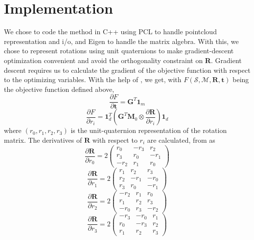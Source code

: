 \documentclass[11pt, a4paper]{article}
\begin{document}
\section{Implementation}
We chose to code the method in C++ using PCL to handle pointcloud representation and i/o, and Eigen to handle the matrix algebra. With this, we chose to represent rotations using unit quaternions to make gradient-descent optimization convenient and avoid the orthogonality constraint on \textbf{R}.
\linebreak \linebreak
\noindent Gradient descent requires us to calculate the gradient of the objective function with respect to the optimizing variables. With the help of \cite{mainPre}, we get, with $F(\mathcal{S}, \mathcal{M}, \textbf{R}, \textbf{t})$ being the objective function defined above, $$\frac{\partial F}{\partial \textbf{t}} = \textbf{G}^T\textbf{1}_m$$ $$\frac{\partial F}{\partial r_i} = \textbf{1}_d^T \left(\textbf{G}^T\textbf{M}_0 \otimes \frac{\partial \textbf{R}}{\partial r_i}\right)\textbf{1}_d$$ where $(r_0, r_1, r_2, r_3)$ is the unit-quaternion representation of the rotation matrix.
\linebreak \linebreak
\noindent
The derivatives of $\textbf{R}$ with respect to $r_i$ are calculated, from \cite{quatParam} as
$$\frac{\partial \textbf{R}}{\partial r_0} = 2\begin{pmatrix}
  r_0 & -r_3 & r_2 \\
  r_3 & r_0 & -r_1 \\
  -r_2 & r_1 & r_0
 \end{pmatrix}$$
$$\frac{\partial \textbf{R}}{\partial r_1} = 2\begin{pmatrix}
  r_1 & r_2 & r_3 \\
  r_2 & -r_1 & -r_0 \\
  r_3 & r_0 & -r_1
 \end{pmatrix}$$
$$\frac{\partial \textbf{R}}{\partial r_2} = 2\begin{pmatrix}
  -r_2 & r_1 & r_0 \\
  r_1 & r_2 & r_3 \\
  -r_0 & r_3 & -r_2
 \end{pmatrix}$$
$$\frac{\partial \textbf{R}}{\partial r_3} = 2\begin{pmatrix}
  -r_3 & -r_0 & r_1 \\
  r_0 & -r_3 & r_2 \\
  r_1 & r_2 & r_3
 \end{pmatrix}$$
\end{document}
